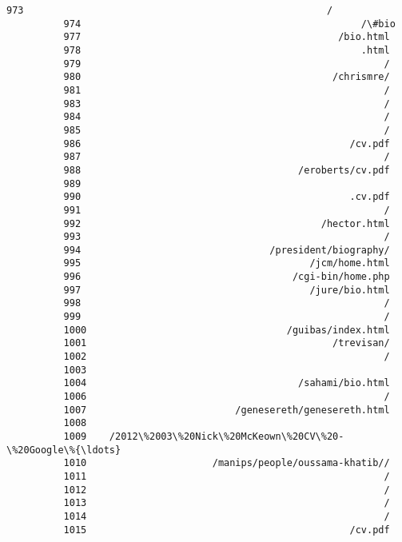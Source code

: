 \documentclass[11pt]{article}
\begin{document}
\begin{Verbatim}[commandchars=\\\{\}]
          973                                                     /
          974                                                 /\#bio
          977                                             /bio.html
          978                                                 .html
          979                                                     /
          980                                            /chrismre/
          981                                                     /
          983                                                     /
          984                                                     /
          985                                                     /
          986                                               /cv.pdf
          987                                                     /
          988                                      /eroberts/cv.pdf
          989                                                      
          990                                               .cv.pdf
          991                                                     /
          992                                          /hector.html
          993                                                     /
          994                                 /president/biography/
          995                                        /jcm/home.html
          996                                     /cgi-bin/home.php
          997                                        /jure/bio.html
          998                                                     /
          999                                                     /
          1000                                   /guibas/index.html
          1001                                           /trevisan/
          1002                                                    /
          1003                                                     
          1004                                     /sahami/bio.html
          1006                                                    /
          1007                          /genesereth/genesereth.html
          1008                                                     
          1009    /2012\%2003\%20Nick\%20McKeown\%20CV\%20-\%20Google\%{\ldots}
          1010                      /manips/people/oussama-khatib//
          1011                                                    /
          1012                                                    /
          1013                                                    /
          1014                                                    /
          1015                                              /cv.pdf

\end{Verbatim}
\end{document}
